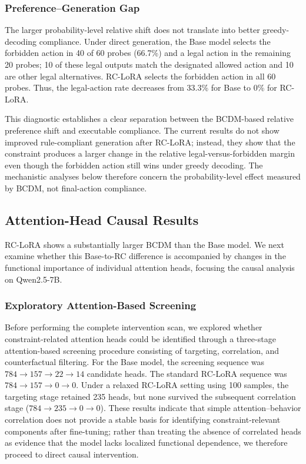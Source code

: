 \subsubsection{Preference--Generation Gap}

The larger probability-level relative shift does not translate into better greedy-decoding compliance. Under direct generation, the Base model selects the forbidden action in 40 of 60 probes (66.7\%) and a legal action in the remaining 20 probes; 10 of these legal outputs match the designated allowed action and 10 are other legal alternatives. RC-LoRA selects the forbidden action in all 60 probes. Thus, the legal-action rate decreases from 33.3\% for Base to 0\% for RC-LoRA.

This diagnostic establishes a clear separation between the BCDM-based relative preference shift and executable compliance. The current results do not show improved rule-compliant generation after RC-LoRA; instead, they show that the constraint produces a larger change in the relative legal-versus-forbidden margin even though the forbidden action still wins under greedy decoding. The mechanistic analyses below therefore concern the probability-level effect measured by BCDM, not final-action compliance.


\subsection{Attention-Head Causal Results}
\label{sec:head_causal_results}

RC-LoRA shows a substantially larger BCDM than the Base model. We next examine whether this Base-to-RC difference is accompanied by changes in the functional importance of individual attention heads, focusing the causal analysis on Qwen2.5-7B.

\subsubsection{Exploratory Attention-Based Screening}

Before performing the complete intervention scan, we explored whether constraint-related attention heads could be identified through a three-stage attention-based screening procedure consisting of targeting, correlation, and counterfactual filtering. For the Base model, the screening sequence was $784\rightarrow157\rightarrow22\rightarrow14$ candidate heads. The standard RC-LoRA sequence was $784\rightarrow157\rightarrow0\rightarrow0$. Under a relaxed RC-LoRA setting using 100 samples, the targeting stage retained 235 heads, but none survived the subsequent correlation stage ($784\rightarrow235\rightarrow0\rightarrow0$). These results indicate that simple attention--behavior correlation does not provide a stable basis for identifying constraint-relevant components after fine-tuning; rather than treating the absence of correlated heads as evidence that the model lacks localized functional dependence, we therefore proceed to direct causal intervention.

